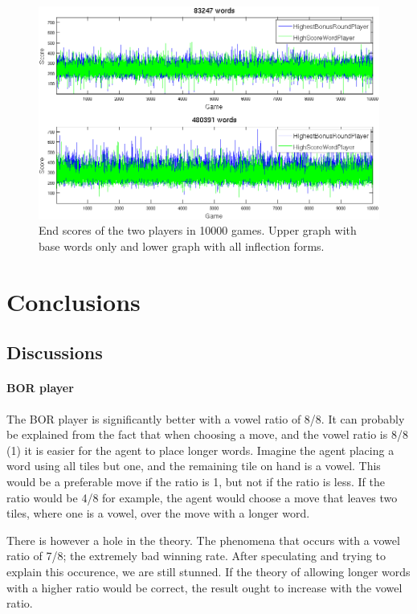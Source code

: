 \documentclass[a4paper, 12pt]{report}
\begin{document}
\begin{figure}[h]
\centering
\includegraphics[scale=0.4]{Highest_Bonus_Round_vs_High_Score_Word_10000_cropped}
\caption {End scores of the two players in 10000 games. Upper graph with base words only and lower graph with all inflection forms.}
\label{fig:bs+hsw+totalscores}
\end{figure}



\chapter{Conclusions}
\section{Discussions}
\subsubsection{BOR player}
The BOR player is significantly better with a vowel ratio of 8/8. It can probably be explained from the fact that when choosing a move, and the vowel ratio is 8/8 (1) it is easier for the agent to place longer words. Imagine the agent placing a word using all tiles but one, and the remaining tile on hand is a vowel. This would be a preferable move if the ratio is 1, but not if the ratio is less. If the ratio would be 4/8 for example, the agent would choose a move that leaves two tiles, where one is a vowel, over the move with a longer word. 

There is however a hole in the theory. The phenomena that occurs with a vowel ratio of 7/8; the extremely bad winning rate. After speculating and trying to explain this occurence, we are still stunned. If the theory of allowing longer words with a higher ratio would be correct, the result ought to increase with the vowel ratio.
\end{document}
